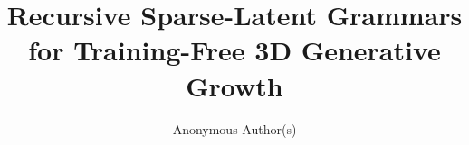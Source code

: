 \documentclass[sigconf,anonymous,review]{acmart}
\title{Recursive Sparse-Latent Grammars for Training-Free 3D Generative Growth}
\author{Anonymous Author(s)}
\affiliation{%
  \institution{Anonymous Institution}
  \city{}
  \country{}
}
\begin{document}
\begin{abstract}

\end{abstract}
\end{document}
